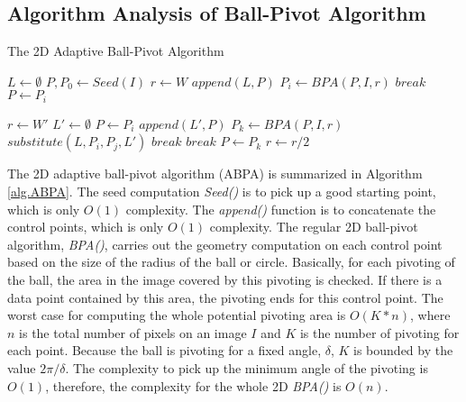 \subsection{Algorithm Analysis of Ball-Pivot Algorithm }

\begin{algorithm}
\caption{The 2D Adaptive Ball-Pivot Algorithm}
\label{alg.ABPA}
\begin{algorithmic}[1]
\State $L \leftarrow \emptyset$
\State $P, P_0 \leftarrow Seed(I) $ 
\State $r \leftarrow W$ 
  
   \State $append(L, P)$
   \State $P_i \leftarrow BPA(P, I, r)$ 
      \State $break$ 
   \EndIf
   \State $P \leftarrow P_i$ 
\EndWhile

\State $r \leftarrow W'$ 
 
      \State $L' \leftarrow \emptyset$
      \State $P \leftarrow P_i$
         \State $append(L', P)$ 
         \State $P_k \leftarrow BPA(P, I, r)$
	  
	    \State $substitute(L, P_i, P_j, L')$ 
	    \State $break$
	   
	    \State $break$
	 \EndIf
	 \State $P \leftarrow P_k$ 
      \EndWhile
   \EndFor
   \State $r \leftarrow r/2$  
\EndWhile
\EndProcedure
\end{algorithmic}
\end{algorithm}

The 2D adaptive ball-pivot algorithm (ABPA) is summarized in Algorithm \ref{alg.ABPA}.
The seed computation {\it Seed()} is to pick up a good starting point,
which is only $O(1)$ complexity.
The {\it append()} function is to concatenate the control
points, which is only $O(1)$ complexity.
The regular 2D ball-pivot algorithm, {\it BPA()},
carries out the geometry computation on each control point based on the size of the
radius of the ball or circle.
Basically, for each pivoting of the ball, the area
in the image covered by this pivoting is checked.
If there is a data point contained by this area,
the pivoting ends for this control point.
The worst case for computing the whole potential pivoting area is $O(K*n)$,
where $n$ is the total number of pixels on an image $I$
and $K$ is the number of pivoting for each point.
Because the ball is pivoting for a fixed angle, $\delta$,
$K$ is bounded by the value $2\pi/\delta$.
The complexity to pick up the minimum angle of the pivoting is $O(1)$,
therefore, the complexity for the whole 2D {\it BPA()} is $O(n)$.

